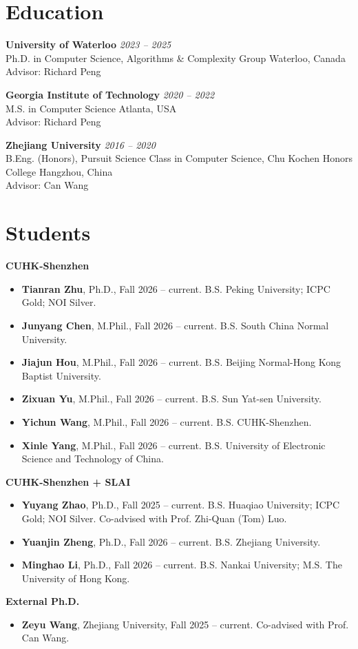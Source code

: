 \documentclass[10pt]{article}
\newcommand{\entry}[4]{%
  \textbf{#1} \hfill \emph{#2}\\
  #3 \hfill #4\\[-2pt]
}
\begin{document}
\section*{Education}
\entry{University of Waterloo}{2023 -- 2025}
{Ph.D. in Computer Science, Algorithms \& Complexity Group}{Waterloo, Canada}
Advisor: Richard Peng

\entry{Georgia Institute of Technology}{2020 -- 2022}
{M.S. in Computer Science}{Atlanta, USA}
Advisor: Richard Peng

\entry{Zhejiang University}{2016 -- 2020}
{B.Eng. (Honors), Pursuit Science Class in Computer Science, Chu Kochen Honors College}{Hangzhou, China}
Advisor: Can Wang

\section*{Students}
\textbf{CUHK-Shenzhen}
\begin{itemize}
  \item \textbf{Tianran Zhu}, Ph.D., Fall 2026 -- current. B.S. Peking University; ICPC Gold; NOI Silver.
  \item \textbf{Junyang Chen}, M.Phil., Fall 2026 -- current. B.S. South China Normal University.
  \item \textbf{Jiajun Hou}, M.Phil., Fall 2026 -- current. B.S. Beijing Normal-Hong Kong Baptist University.
  \item \textbf{Zixuan Yu}, M.Phil., Fall 2026 -- current. B.S. Sun Yat-sen University.
  \item \textbf{Yichun Wang}, M.Phil., Fall 2026 -- current. B.S. CUHK-Shenzhen.
  \item \textbf{Xinle Yang}, M.Phil., Fall 2026 -- current. B.S. University of Electronic Science and Technology of China.
\end{itemize}

\textbf{CUHK-Shenzhen + SLAI}
\begin{itemize}
  \item \textbf{Yuyang Zhao}, Ph.D., Fall 2025 -- current. B.S. Huaqiao University; ICPC Gold; NOI Silver. Co-advised with Prof. Zhi-Quan (Tom) Luo.
  \item \textbf{Yuanjin Zheng}, Ph.D., Fall 2026 -- current. B.S. Zhejiang University.
  \item \textbf{Minghao Li}, Ph.D., Fall 2026 -- current. B.S. Nankai University; M.S. The University of Hong Kong.
\end{itemize}

\textbf{External Ph.D.}
\begin{itemize}
  \item \textbf{Zeyu Wang}, Zhejiang University, Fall 2025 -- current. Co-advised with Prof. Can Wang.
\end{itemize}
\end{document}
